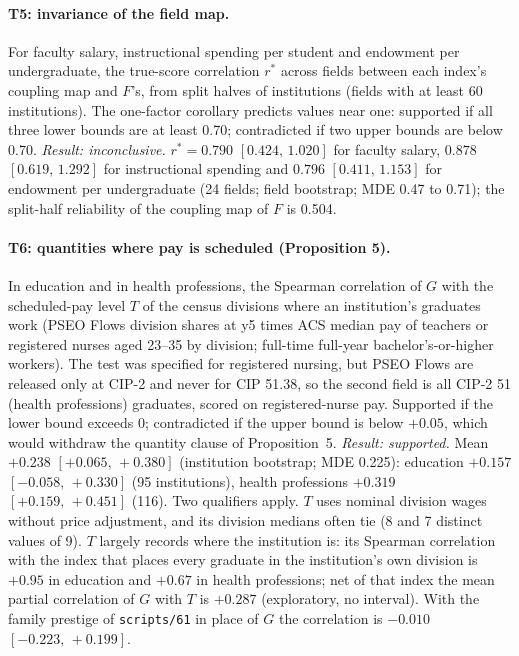\documentclass[11pt]{article}
\newcommand{\ci}[2]{$[#1,\allowbreak\,#2]$}
\newcommand{\scr}[1]{\texttt{scripts/#1}}
\begin{document}
\paragraph{T5: invariance of the field map.} For faculty salary, instructional spending per student and endowment
per undergraduate, the true-score correlation $r^*$ across fields between each index's coupling map and $F$'s, from split
halves of institutions (fields with at least 60 institutions). The one-factor corollary predicts values near one:
supported if all three lower bounds are at least 0.70; contradicted if two upper bounds are below 0.70.
\emph{Result: inconclusive.} $r^*=0.790$ \ci{0.424}{1.020} for faculty salary, $0.878$ \ci{0.619}{1.292} for
instructional spending and $0.796$ \ci{0.411}{1.153} for endowment per undergraduate (24 fields; field bootstrap; MDE 0.47
to 0.71); the split-half reliability of the coupling map of $F$ is 0.504.

\paragraph{T6: quantities where pay is scheduled (Proposition 5).} In education and in health professions, the
Spearman correlation of $G$ with the scheduled-pay level $T$ of the census divisions where an institution's
graduates work (PSEO Flows division shares at y5 times ACS median pay of teachers or registered nurses aged 23--35 by
division; full-time full-year bachelor's-or-higher workers). The test was specified for registered nursing, but PSEO
Flows are released only at CIP-2 and never for CIP 51.38, so the second field is all CIP-2 51 (health professions)
graduates, scored on registered-nurse pay. Supported if the lower bound exceeds 0; contradicted if the upper bound is below $+0.05$, which would
withdraw the quantity clause of Proposition~5. \emph{Result: supported.} Mean $+0.238$ \ci{+0.065}{+0.380}
(institution bootstrap; MDE 0.225): education $+0.157$ \ci{-0.058}{+0.330} (95 institutions), health professions
$+0.319$ \ci{+0.159}{+0.451} (116). Two qualifiers apply. $T$ uses nominal division wages without price adjustment, and its
division medians often tie (8 and 7 distinct values of 9). $T$ largely records where the institution is: its
Spearman correlation with the index that places every graduate in the institution's own division is $+0.95$ in
education and $+0.67$ in health professions; net of that index the mean partial correlation of $G$ with $T$ is $+0.287$
(exploratory, no interval). With the family prestige of \scr{61} in place of $G$ the correlation is $-0.010$
\ci{-0.223}{+0.199}.
\end{document}
